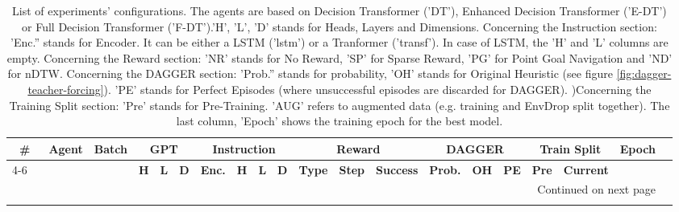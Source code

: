 \begin{longtable}{@{\hskip3pt}c@{\hskip3pt}c@{\hskip3pt}c@{\hskip3pt}c@{\hskip3pt}c@{\hskip3pt}c@{\hskip3pt}c@{\hskip3pt}c@{\hskip3pt}c@{\hskip3pt}c@{\hskip3pt}c@{\hskip3pt}c@{\hskip3pt}c@{\hskip3pt}c@{\hskip3pt}c@{\hskip3pt}c@{\hskip3pt}c@{\hskip3pt}c@{\hskip3pt}c@{\hskip3pt}c}
\caption{List of experiments' configurations. \newline The agents are based on Decision Transformer ('DT'), Enhanced Decision Transformer ('E-DT') or Full Decision Transformer ('F-DT').\newline 'H', 'L', 'D' stands for Heads, Layers and Dimensions. \newline Concerning the Instruction section: 'Enc.'' stands for Encoder. It can be either a LSTM ('lstm') or a Tranformer ('transf'). In case of LSTM, the 'H' and 'L' columns are empty. \newline Concerning the Reward section: ’NR’ stands for No Reward, ’SP’ for Sparse Reward, ’PG’ for Point Goal Navigation and ’ND’ for nDTW.  \newline Concerning the DAGGER section: 'Prob.'' stands for probability, 'OH' stands for Original Heuristic (see figure \ref{fig:dagger-teacher-forcing}). 'PE' stands for Perfect Episodes (where unsuccessful episodes are discarded for DAGGER). )\newline Concerning the Training Split section: 'Pre' stands for Pre-Training. 'AUG' refers to augmented data (e.g. training and EnvDrop split together). The last column, 'Epoch' shows the training epoch for the best model.}\\
\toprule
\textbf{\#} & \textbf{Agent} & \textbf{Batch} & \multicolumn{3}{c}{\textbf{GPT}} & \multicolumn{4}{c}{\textbf{Instruction}} & \multicolumn{3}{c}{\textbf{Reward}} & \multicolumn{3}{c}{\textbf{DAGGER}} & \multicolumn{2}{c}{\textbf{Train Split}} & \textbf{Epoch} \\
 \cmidrule(l){4-6} \textbf{~} &     \textbf{~} &     \textbf{~} &   \textbf{H} & \textbf{L} & \textbf{D} &        \textbf{Enc.} & \textbf{H} & \textbf{L} & \textbf{D} &   \textbf{Type} & \textbf{Step} & \textbf{Success} &  \textbf{Prob.} & \textbf{OH} & \textbf{PE} &         \textbf{Pre} & \textbf{Current} &     \textbf{~} \\
\midrule
\endhead
\midrule
\multicolumn{19}{r}{{Continued on next page}} \\
\midrule
\endfoot


\end{longtable}
